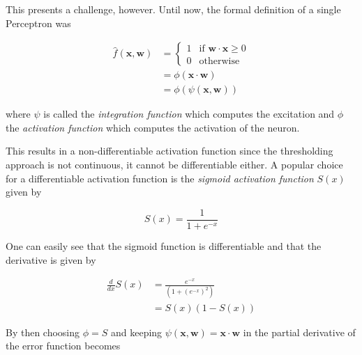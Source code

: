 This presents a challenge, however.
Until now, the formal definition of a single Perceptron was

\begin{equation}
    \begin{split}
        \hat{f}(\bm{x}, \bm{w})
        &=
            \begin{cases}
                1 & \text{if } \bm{w} \cdot \bm{x} \geq 0 \\
                0 & \text{otherwise}
            \end{cases}
        \\
        &= \phi(\bm{x} \cdot \bm{w})
        \\
        &= \phi(\psi(\bm{x}, \bm{w}))
    \end{split}
\end{equation}

where $\psi$ is called the \textit{integration function} which computes the excitation and $\phi$ the \textit{activation function} which computes the activation of the neuron.

This results in a non-differentiable activation function since the thresholding approach is not continuous, it cannot be differentiable either.
A popular choice for a differentiable activation function is the \textit{sigmoid activation function} $S(x)$ given by

\begin{equation}
    S(x) = \frac{1}{1 + e^{-x}}
\end{equation}

One can easily see that the sigmoid function is differentiable and that the derivative is given by

\begin{equation}
    \begin{split}
        \frac{d}{dx} S(x)
        &= \frac{e^{-x}}{(1 + (e^{-x})^2)} \\
        &= S(x)(1 - S(x))
    \end{split}
\end{equation}

By then choosing $\phi = S$ and keeping $\psi(\bm{x}, \bm{w}) = \bm{x} \cdot \bm{w}$ in  the partial derivative of the error function becomes

